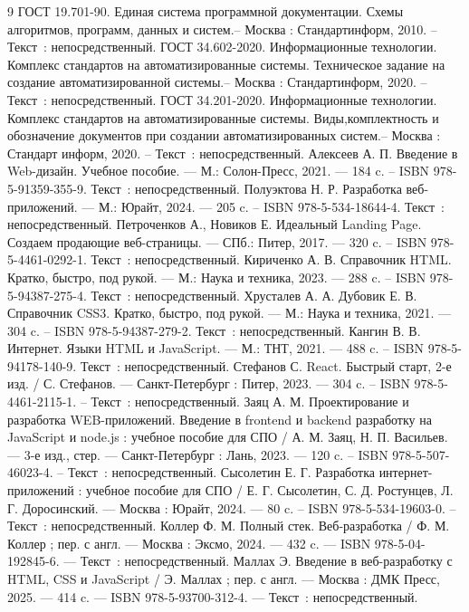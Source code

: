 \begin{thebibliography}{9}
     ГОСТ 19.701-90. Единая система программной документации. Схемы алгоритмов, программ, данных и систем.– Москва : Стандартинформ, 2010. – Текст~: непосредственный.
     ГОСТ 34.602-2020. Информационные технологии. Комплекс стандартов на автоматизированные системы. Техническое задание на создание автоматизированной системы.– Москва : Стандартинформ, 2020. – Текст~: непосредственный.
     ГОСТ 34.201-2020. Информационные технологии. Комплекс стандартов на автоматизированные системы. Виды,комплектность и обозначение документов при создании автоматизированных систем.– Москва : Стандарт информ, 2020. – Текст~: непосредственный.
     Алексеев А. П. Введение в Web-дизайн. Учебное пособие. — М.: Солон-Пресс, 2021. — 184 c. – ISBN 978-5-91359-355-9. Текст~: непосредственный.
     Полуэктова Н. Р. Разработка веб-приложений. — М.: Юрайт, 2024. — 205 c. – ISBN 978-5-534-18644-4. Текст~: непосредственный.
     Петроченков А., Новиков Е. Идеальный Landing Page. Создаем продающие веб-страницы. — СПб.: Питер, 2017. — 320 c. – ISBN 978-5-4461-0292-1. Текст~: непосредственный.
     Кириченко А. В. Справочник HTML. Кратко, быстро, под рукой. — М.: Наука и техника, 2023. — 288 c. – ISBN 978-5-94387-275-4. Текст~: непосредственный.
     Хрусталев А. А. Дубовик Е. В. Справочник CSS3. Кратко, быстро, под рукой. — М.: Наука и техника, 2021. — 304 c. – ISBN 978-5-94387-279-2. Текст~: непосредственный.
     Кангин В. В. Интернет. Языки HTML и JavaScript. — М.: ТНТ, 2021. — 488 c. – ISBN 978-5-94178-140-9. Текст~: непосредственный.
     Стефанов С. React. Быстрый старт, 2-е изд. / С. Стефанов. — Санкт-Петербург : Питер, 2023. — 304 c. – ISBN 978-5-4461-2115-1. – Текст~: непосредственный.
     Заяц А. М. Проектирование и разработка WEB-приложений. Введение в frontend и backend разработку на JavaScript и node.js : учебное пособие для СПО / А. М. Заяц, Н. П. Васильев. — 3-е изд., стер. — Санкт-Петербург : Лань, 2023. — 120 c. – ISBN 978-5-507-46023-4. – Текст~: непосредственный.
     Сысолетин Е. Г. Разработка интернет-приложений : учебное пособие для СПО / Е. Г. Сысолетин, С. Д. Ростунцев, Л. Г. Доросинский. — Москва : Юрайт, 2024. — 80 c. – ISBN 978-5-534-19603-0. – Текст~: непосредственный.
     Коллер Ф. М. Полный стек. Веб-разработка / Ф. М. Коллер ; пер. с англ. — Москва : Эксмо, 2024. — 432 c. — ISBN 978-5-04-192845-6. — Текст~: непосредственный.
     Маллах Э. Введение в веб-разработку с HTML, CSS и JavaScript / Э. Маллах ; пер. с англ. — Москва : ДМК Пресс, 2025. — 414 c. — ISBN 978-5-93700-312-4. — Текст~: непосредственный.

\end{thebibliography}
